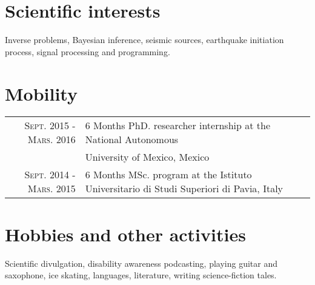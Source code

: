 \documentclass[a4paper,10.5pt]{article} %
\begin{document}
\vskip 0.5cm
\section{Scientific interests}

Inverse problems, Bayesian inference, seismic sources, earthquake initiation process, signal processing and programming.

\vskip 0.5cm
\section{Mobility}
\begin{tabular}{rp{11cm}}

{ \textsc{Sept. 2015 - Mars. 2016 }} & 6 Months PhD. researcher internship at the National Autonomous \\  & University of Mexico, Mexico  \\

{ \textsc{Sept. 2014 - Mars. 2015 }} & 6 Months MSc. program at the Istituto Universitario di Studi Superiori di Pavia, Italy  \\[0.6em] 

\end{tabular}


\vskip 0.5cm
\section{Hobbies and other activities}

Scientific divulgation, disability awareness podcasting,
playing guitar and saxophone, ice skating, languages, literature, writing science-fiction tales.
\end{document}
